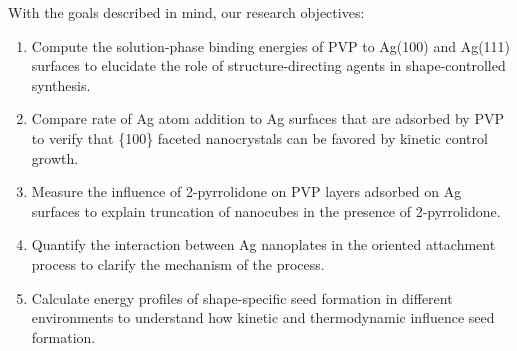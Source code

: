With the goals described in mind, our research objectives:
\begin{enumerate}
\item Compute the solution-phase binding energies of PVP to Ag(100) and Ag(111) surfaces to elucidate the role of structure-directing agents in shape-controlled synthesis.
\item Compare rate of Ag atom addition to Ag surfaces that are adsorbed by PVP to verify that \{100\} faceted nanocrystals can be favored by kinetic control growth.
\item Measure the influence of 2-pyrrolidone on PVP layers adsorbed on Ag surfaces to explain truncation of nanocubes in the presence of 2-pyrrolidone.
\item Quantify the interaction between Ag nanoplates in the oriented attachment process to clarify the mechanism of the process.
\item Calculate energy profiles of shape-specific seed formation in different environments to understand how kinetic and thermodynamic influence seed formation.
\end{enumerate}

  
  
  
  
  